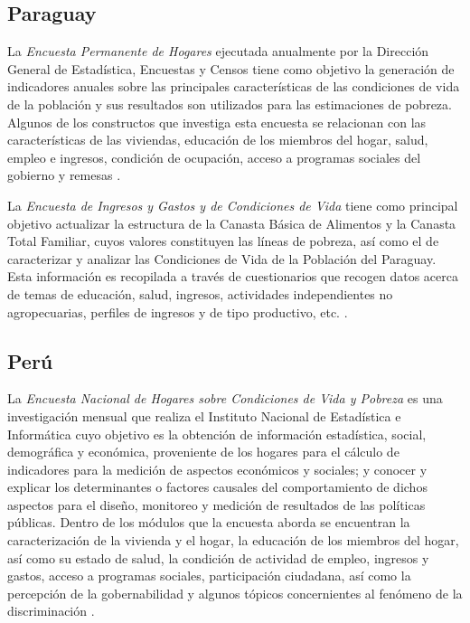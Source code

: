 \documentclass[
  10pt,
  spanish,
]{book}
\begin{document}
\hypertarget{paraguay}{%
\subsection*{Paraguay}\label{paraguay}}

La \emph{Encuesta Permanente de Hogares} ejecutada anualmente por la Dirección General de Estadística, Encuestas y Censos tiene como objetivo la generación de indicadores anuales sobre las principales características de las condiciones de vida de la población y sus resultados son utilizados para las estimaciones de pobreza. Algunos de los constructos que investiga esta encuesta se relacionan con las características de las viviendas, educación de los miembros del hogar, salud, empleo e ingresos, condición de ocupación, acceso a programas sociales del gobierno y remesas \citep{DGEEC-PY}.

La \emph{Encuesta de Ingresos y Gastos y de Condiciones de Vida} tiene como principal objetivo actualizar la estructura de la Canasta Básica de Alimentos y la Canasta Total Familiar, cuyos valores constituyen las líneas de pobreza, así como el de caracterizar y analizar las Condiciones de Vida de la Población del Paraguay. Esta información es recopilada a través de cuestionarios que recogen datos acerca de temas de educación, salud, ingresos, actividades independientes no agropecuarias, perfiles de ingresos y de tipo productivo, etc. \citep{DGEEC2-PY}.

\hypertarget{peruxfa}{%
\subsection*{Perú}\label{peruxfa}}

La \emph{Encuesta Nacional de Hogares sobre Condiciones de Vida y Pobreza} es una investigación mensual que realiza el Instituto Nacional de Estadística e Informática cuyo objetivo es la obtención de información estadística, social, demográfica y económica, proveniente de los hogares para el cálculo de indicadores para la medición de aspectos económicos y sociales; y conocer y explicar los determinantes o factores causales del comportamiento de dichos aspectos para el diseño, monitoreo y medición de resultados de las políticas públicas. Dentro de los módulos que la encuesta aborda se encuentran la caracterización de la vivienda y el hogar, la educación de los miembros del hogar, así como su estado de salud, la condición de actividad de empleo, ingresos y gastos, acceso a programas sociales, participación ciudadana, así como la percepción de la gobernabilidad y algunos tópicos concernientes al fenómeno de la discriminación \citep{INEI-PE_2016}.
\end{document}

